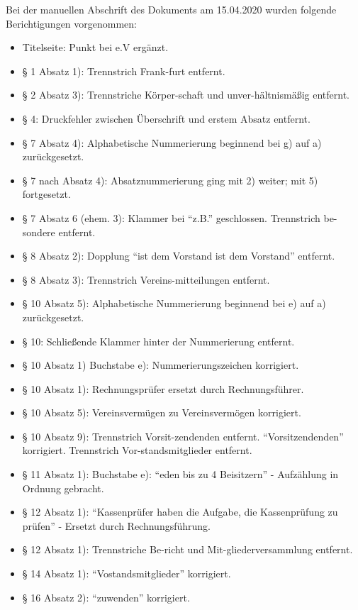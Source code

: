 \documentclass[11pt]{article}
\begin{document}
\newpage
\begin{appendix}
Bei der manuellen Abschrift des Dokuments am 15.04.2020 wurden folgende Berichtigungen vorgenommen:
\begin{itemize}
	\item Titelseite: Punkt bei e.V ergänzt.
	\item § 1 Absatz 1): Trennstrich Frank-furt entfernt.
	\item § 2 Absatz 3): Trennstriche Körper-schaft und unver-hältnismäßig entfernt.
	\item § 4: Druckfehler zwischen Überschrift und erstem Absatz entfernt.
	\item § 7 Absatz 4): Alphabetische Nummerierung beginnend bei g) auf a) zurückgesetzt.
	\item § 7 nach Absatz 4): Absatznummerierung ging mit 2) weiter; mit 5) fortgesetzt.
	\item § 7 Absatz 6 (ehem. 3): Klammer bei "`z.B."' geschlossen. Trennstrich be-sondere entfernt.
	\item § 8 Absatz 2): Dopplung "`ist dem Vorstand ist dem Vorstand"' entfernt.
	\item § 8 Absatz 3): Trennstrich Vereins-mitteilungen entfernt.
	\item § 10 Absatz 5): Alphabetische Nummerierung beginnend bei e) auf a) zurückgesetzt.
	\item § 10: Schließende Klammer hinter der Nummerierung entfernt.
	\item § 10 Absatz 1) Buchstabe e): Nummerierungszeichen korrigiert.
	\item § 10 Absatz 1): Rechnungsprüfer ersetzt durch Rechnungsführer.
	\item § 10 Absatz 5): Vereinsvermügen zu Vereinsvermögen korrigiert.
	\item § 10 Absatz 9): Trennstrich Vorsit-zendenden entfernt. "`Vorsitzendenden"' korrigiert. Trennstrich Vor-standsmitglieder entfernt.
	\item § 11 Absatz 1): Buchstabe e): "`eden bis zu 4 Beisitzern"' - Aufzählung in Ordnung gebracht.
	\item § 12 Absatz 1): "`Kassenprüfer haben die Aufgabe, die Kassenprüfung zu prüfen"' - Ersetzt durch Rechnungsführung.
	\item § 12 Absatz 1): Trennstriche Be-richt und Mit-gliederversammlung entfernt.
	\item § 14 Absatz 1): "`Vostandsmitglieder"' korrigiert.
	\item § 16 Absatz 2): "`zuwenden"' korrigiert.
\end{itemize}


\end{appendix}
\end{document}
